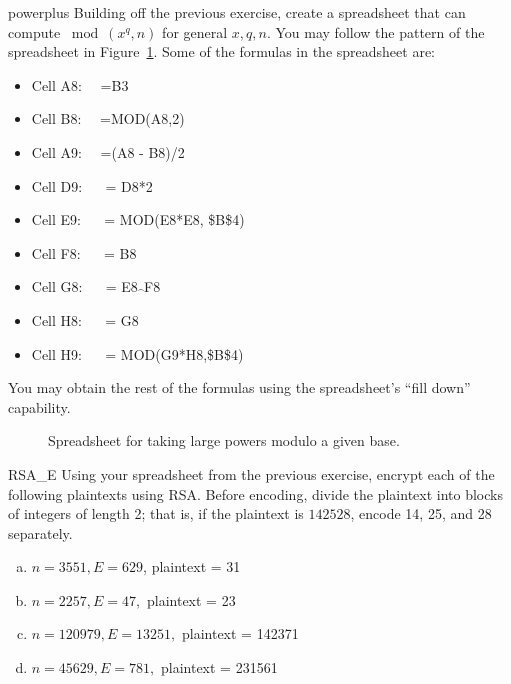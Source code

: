 \begin{exercise}{powerplus}
Building off the previous exercise, create a spreadsheet that can compute $\bmod(x^{q},n)$ for general $x,q,n$.  You may follow the pattern of the spreadsheet in Figure~\ref{fig:LargePowMod}.  Some of the formulas in the spreadsheet are:
\begin{itemize}
\item
Cell A8: ~~=B3
\item
Cell B8: ~~=MOD(A8,2)
\item
Cell A9: ~~=(A8 - B8)/2
\item
Cell D9: ~~ = D8*2
\item
Cell E9: ~~ = MOD(E8*E8, \$B\$4)
\item
Cell F8: ~~ = B8
\item
Cell G8: ~~ = E8$\widehat{~~}$F8
\item
Cell H8: ~~ = G8
\item
Cell H9: ~~ = MOD(G9*H8,\$B\$4)
\end{itemize}
You may obtain the rest of the formulas using the spreadsheet's ``fill down'' capability.

\begin{figure}[h]
\caption{Spreadsheet for taking large powers modulo a given base.}
\label{fig:LargePowMod}
\end{figure}
\end{exercise} 


\begin{exercise}{RSA_E}
Using your spreadsheet from the previous exercise, encrypt each of the following plaintexts using RSA. Before encoding, divide the plaintext
into blocks of integers of length 2;  that is, if the plaintext is $142528$, encode 
14, 25, and 28 separately.
 
\begin{enumerate}[(a)]
  \item
$n = 3551, E = 629$, plaintext = 31
 \item
$n = 2257, E = 47, $ plaintext  = 23
 \item
$n = 120979, E = 13251,$ plaintext = 142371
\item
$n = 45629, E = 781,$ plaintext = 231561
 
\end{enumerate}
\end{exercise}
 
